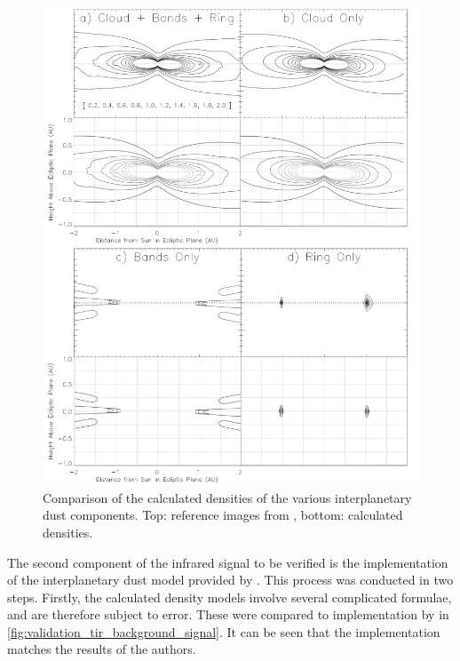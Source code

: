 \begin{figure}[ph]
 \centering
 \includegraphics[width=1.0\textwidth]{img/validation_tir_background_signal.png}
 \caption{Comparison of the calculated densities of the various interplanetary dust components. Top: reference images from \cite{IRDust}, bottom: calculated densities.}
 \label{fig:validation_tir_background_signal}
\end{figure}

The second component of the infrared signal to be verified is the implementation of the interplanetary dust model provided by \cite{IRDust}. This process was conducted in two steps. Firstly, the calculated density models involve several complicated formulae, and are therefore subject to error. These were compared to implementation by \cite{IRDust} in \autoref{fig:validation_tir_background_signal}. It can be seen that the implementation matches the results of the authors. \\

